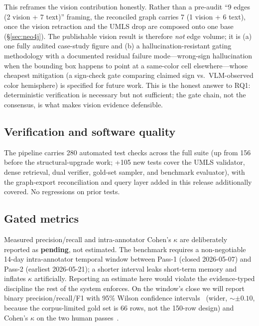 \documentclass[10pt,twocolumn,letterpaper]{article}
\begin{document}
This reframes the vision contribution honestly. Rather than a pre-audit ``9
edges (2 vision + 7 text)'' framing, the reconciled graph carries 7 (1 vision
+ 6 text), once the vision retraction and the UMLS drop are composed onto one
base (\S\ref{sec:neo4j}). The publishable vision result is therefore
\emph{not} edge volume;
it is (a) one fully audited case-study figure and (b) a hallucination-resistant
gating methodology with a documented residual failure mode---wrong-sign
hallucination when the bounding box happens to point at a same-color cell
elsewhere---whose cheapest mitigation (a sign-check gate comparing claimed
sign vs.\ VLM-observed color hemisphere) is specified for future work. This is
the honest answer to RQ1: deterministic verification is necessary but not
sufficient; the gate chain, not the consensus, is what makes vision evidence
defensible.

\subsection{Verification and software quality}

The pipeline carries 280 automated test checks across the full suite (up from
156 before the structural-upgrade work; +105 new tests cover the UMLS
validator, dense retrieval, dual verifier, gold-set sampler, and benchmark
evaluator), with the graph-export reconciliation and query layer added in
this release additionally covered. No regressions on prior tests.

\subsection{Gated metrics}
\label{sec:eval}

Measured precision/recall and intra-annotator Cohen's $\kappa$ are
deliberately reported as \textbf{pending}, not estimated. The benchmark
requires a non-negotiable 14-day intra-annotator temporal window between
Pass-1 (closed 2026-05-07) and Pass-2 (earliest 2026-05-21); a shorter
interval leaks short-term memory and inflates $\kappa$ artificially.
Reporting an estimate here would violate the evidence-typed discipline the
rest of the system enforces. On the window's close we will report binary
precision/recall/F1 with 95\% Wilson confidence
intervals~\cite{wilson1927} (wider, $\sim\pm0.10$, because the
corpus-limited gold set is 66 rows, not the 150-row design) and Cohen's
$\kappa$ on the two human passes~\cite{landis1977kappa}.

\end{document}
